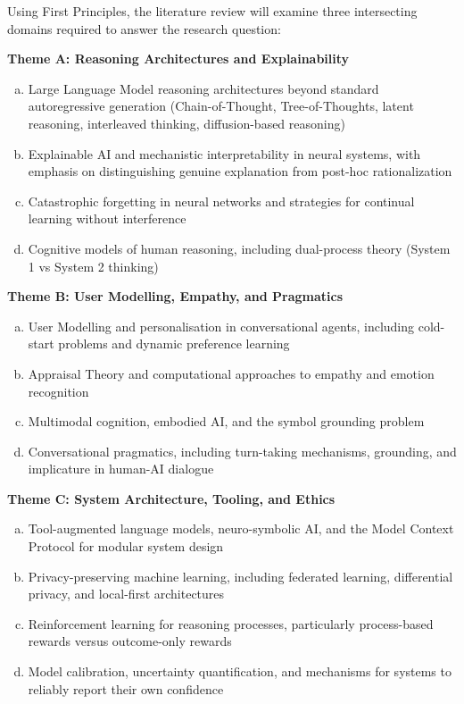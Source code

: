 \documentclass[a4paper,oneside,12pt]{book}
\numberwithin{equation}{chapter} %
\begin{document}
Using First Principles, the literature review will examine three intersecting domains required to answer the research question:

\textbf{Theme A: Reasoning Architectures and Explainability}

\begin{enumerate}[(a)]
\item Large Language Model reasoning architectures beyond standard autoregressive generation (Chain-of-Thought, Tree-of-Thoughts, latent reasoning, interleaved thinking, diffusion-based reasoning)
\item Explainable AI and mechanistic interpretability in neural systems, with emphasis on distinguishing genuine explanation from post-hoc rationalization
\item Catastrophic forgetting in neural networks and strategies for continual learning without interference
\item Cognitive models of human reasoning, including dual-process theory (System 1 vs System 2 thinking)
\end{enumerate}

\textbf{Theme B: User Modelling, Empathy, and Pragmatics}

\begin{enumerate}[(a)]
\item User Modelling and personalisation in conversational agents, including cold-start problems and dynamic preference learning
\item Appraisal Theory and computational approaches to empathy and emotion recognition
\item Multimodal cognition, embodied AI, and the symbol grounding problem
\item Conversational pragmatics, including turn-taking mechanisms, grounding, and implicature in human-AI dialogue
\end{enumerate}

\textbf{Theme C: System Architecture, Tooling, and Ethics}

\begin{enumerate}[(a)]
\item Tool-augmented language models, neuro-symbolic AI, and the Model Context Protocol for modular system design
\item Privacy-preserving machine learning, including federated learning, differential privacy, and local-first architectures
\item Reinforcement learning for reasoning processes, particularly process-based rewards versus outcome-only rewards
\item Model calibration, uncertainty quantification, and mechanisms for systems to reliably report their own confidence

\end{enumerate}
\end{document}
